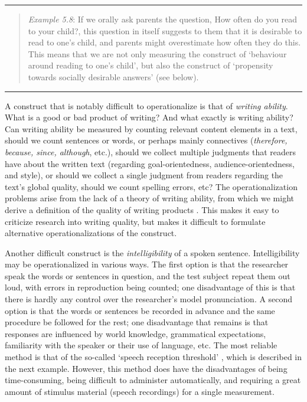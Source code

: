 \documentclass[
]{book}
\begin{document}
\begin{center}\rule{0.5\linewidth}{0.5pt}\end{center}

\begin{quote}
\emph{Example 5.8}: If we orally ask parents the question, How often do you read to your child?, this question in itself suggests to them that it is desirable to read to one's child, and parents might overestimate how often they do this. This means that we are not only measuring the construct of `behaviour around reading to one's child', but also the construct of `propensity towards socially desirable answers' (see below).
\end{quote}

\begin{center}\rule{0.5\linewidth}{0.5pt}\end{center}

A construct that is notably difficult to operationalize is that of \emph{writing ability}. What is a good or bad product of writing? And what exactly is writing ability? Can writing ability be measured by counting relevant content elements in a text, should we count sentences or words, or perhaps mainly connectives (\emph{therefore, because, since, although}, etc.), should we collect multiple judgments that readers have about the written text (regarding goal-orientedness, audience-orientedness, and style), or should we collect a single judgment from readers regarding the text's global quality, should we count spelling errors, etc? The operationalization problems arise from the lack of a theory of writing ability, from which we might derive a definition of the quality of writing products \citep{BM93}. This makes it easy to criticize research into writing quality, but makes it difficult to formulate alternative operationalizations of the construct.

Another difficult construct is the \emph{intelligibility} of a spoken sentence. Intelligibility may be operationalized in various ways. The first option is that the researcher speak the words or sentences in question, and the test subject repeat them out loud, with errors in reproduction being counted; one disadvantage of this is that there is hardly any control over the researcher's model pronunciation. A second option is that the words or sentences be recorded in advance and the same procedure be followed for the rest; one disadvantage that remains is that responses are influenced by world knowledge, grammatical expectations, familiarity with the speaker or their use of language, etc. The most reliable method is that of the so-called `speech reception threshold' \citep{Plomp79}, which is described in the next example. However, this method does have the disadvantages of being time-consuming, being difficult to administer automatically, and requiring a great amount of stimulus material (speech recordings) for a single measurement.
\end{document}
